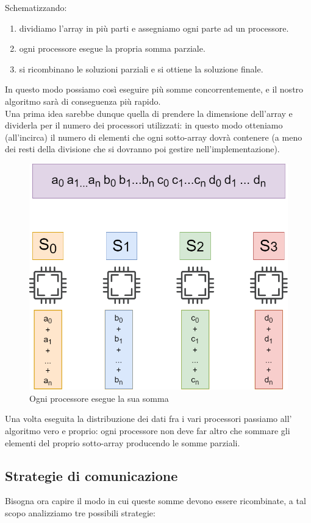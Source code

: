 \documentclass{article}
\begin{document}
    Schematizzando:
    \begin{enumerate}
        \item dividiamo l'array in più parti e assegniamo ogni parte ad un processore.
        \item ogni processore esegue la propria somma parziale.
        \item si ricombinano le soluzioni parziali e si ottiene la soluzione finale.
    \end{enumerate}

    In questo modo possiamo così eseguire più somme concorrentemente, e il nostro algoritmo sarà di conseguenza più rapido.\\
    Una prima idea sarebbe dunque quella di prendere la dimensione dell'array e dividerla per il numero dei processori utilizzati: in questo modo otteniamo (all'incirca) il numero di elementi che ogni sotto-array dovrà contenere (a meno dei resti della divisione che si dovranno poi gestire nell'implementazione).

    \begin{figure}[!htbp]
        \centering
        \includegraphics[width=0.6\linewidth]{somme_parziali.drawio (1).png}
        \caption{Ogni processore esegue la sua somma}
        \label{fig:enter-label}
    \end{figure}

    Una volta eseguita la distribuzione dei dati fra i vari processori passiamo all' algoritmo vero e proprio: ogni processore non deve far altro che sommare gli elementi del proprio sotto-array producendo le somme parziali.\\
    

\subsection{Strategie di comunicazione}
 Bisogna ora capire il modo in cui queste somme devono essere ricombinate, a tal scopo analizziamo tre possibili strategie:
\end{document}
